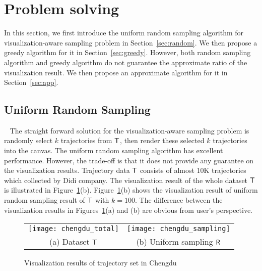 \section{Problem solving}
In this section, we first introduce the uniform random sampling algorithm for visualization-aware sampling problem in Section~\ref{sec:random}.
We then propose a greedy algorithm for it in Section~\ref{sec:greedy}.
However, both random sampling algorithm and greedy algorithm do not guarantee the approximate ratio of the visualization result.
We then propose an approximate algorithm for it in Section~\ref{sec:app}.

\subsection{Uniform Random Sampling}~\label{sec:random}
The straight forward solution for the visualization-aware sampling problem is randomly select $k$ trajectories from $\mathsf{T}$, 
then render these selected $k$ trajectories into the canvas.
The uniform random sampling algorithm has excellent performance.
However, the trade-off is that it does not provide any guarantee on the visualization results.
Trajectory data $\mathsf{T}$\cite{xxx} consists of almost 10K trajectories which collected by Didi company.
The visualization result of the whole dataset $\mathsf{T}$ is illustrated in Figure~\ref{fig:demo}(b).
Figure~\ref{fig:demo}(b) shows the visualization result of uniform random sampling result of $\mathsf{T}$ with $k=100$.
The difference between the visualization results in Figures~\ref{fig:demo}(a) and (b) are obvious from user's perspective.

\begin{figure}
 \centering
 \small
 \begin{tabular}{cc}
   \texttt{[image: chengdu\_total]}
   &
   \texttt{[image: chengdu\_sampling]}
   \\
   (a) Dataset $\mathsf{T}$
   &
   (b) Uniform sampling $\mathsf{R}$
 \end{tabular}
 \caption{Visualization results of trajectory set in Chengdu}
 \label{fig:demo}
\end{figure}

